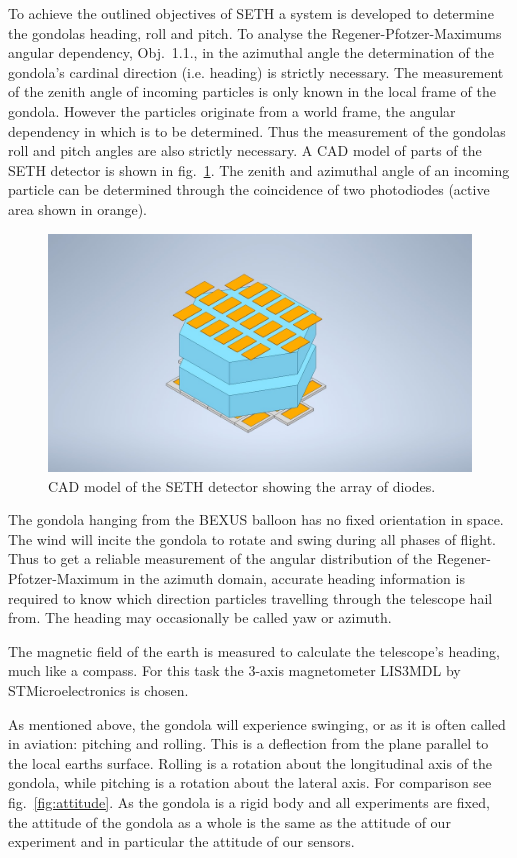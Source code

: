 To achieve the outlined objectives of \ac{SETH} a system is developed to determine the gondolas heading, roll and pitch. To analyse the Regener-Pfotzer-Maximums angular dependency, Obj.~1.1., in the azimuthal angle the determination of the gondola's cardinal direction (i.e. heading) is strictly necessary. The measurement of the zenith angle of incoming particles is only known in the local frame of the gondola. However the particles originate from a world frame, the angular dependency in which is to be determined. Thus the measurement of the gondolas roll and pitch angles are also strictly necessary. A \ac{CAD} model of parts of the \ac{SETH} detector is shown in fig.~\ref{fig:seth_cad}. The zenith and azimuthal angle of an incoming particle can be determined through the coincidence of two photodiodes (active area shown in orange).

\begin{figure}[H]
    \centering
    \includegraphics[width=0.5\linewidth, trim = {5cm 0cm 5cm 0cm}, clip]{images/01_background/SETH-Sketch.jpeg}
    \caption[\ac{SETH} detector sketch]{\ac{CAD} model of the \ac{SETH} detector showing the array of diodes.}
    \label{fig:seth_cad}
\end{figure}

The gondola hanging from the \ac{BEXUS} balloon has no fixed orientation in space. The wind will incite the gondola to rotate and swing during all phases of flight. Thus to get a reliable measurement of the angular distribution of the Regener-Pfotzer-Maximum in the azimuth domain, accurate heading information is required to know which direction particles travelling through the telescope hail from. The heading may occasionally be called yaw or azimuth.


The magnetic field of the earth is measured to calculate the telescope's heading, much like a compass. For this task the 3-axis magnetometer LIS3MDL by STMicroelectronics is chosen.

As mentioned above, the gondola will experience swinging, or as it is often called in aviation: pitching and rolling. This is a deflection from the plane parallel to the local earths surface. Rolling is a rotation about the longitudinal axis of the gondola, while pitching is a rotation about the lateral axis. For comparison see fig.~\ref{fig:attitude}. As the gondola is a rigid body and all experiments are fixed, the attitude of the gondola as a whole is the same as the attitude of our experiment and in particular the attitude of our sensors.


